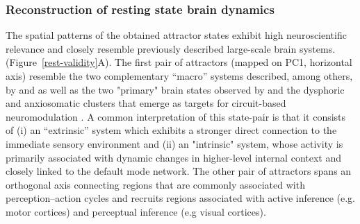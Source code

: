 \documentclass{article}
\begin{document}
\subsubsection{Reconstruction of resting state brain dynamics}\label{Reconstruction of resting state brain dynamics}

The spatial patterns of the obtained attractor states exhibit high neuroscientific relevance and closely resemble previously described large-scale brain systems. (Figure~\ref{rest-validity}A). The first pair of attractors (mapped on PC1, horizontal axis) resemble the two complementary ``macro'' systems described, among others, by \citet{golland2008data} and \citet{cioli2014differences} as well as the two "primary" brain states observed by \citet{chen2018human} and the dysphoric and anxiosomatic clusters that emerge as targets for circuit-based neuromodulation \citep{siddiqi2020distinct}. A common interpretation of this state-pair is that it consists of (i) an ``extrinsic'' system
which exhibits a stronger direct connection to the immediate sensory environment and (ii) an "intrinsic" system, whose
activity is primarily associated with dynamic changes in higher-level internal context and closely linked to the default
mode network.
The other pair of attractors spans an orthogonal axis connecting regions that are commonly associated
with perception--action cycles \citep{fuster2004upper} and recruits regions associated with active inference (e.g. motor cortices) and perceptual inference (e.g visual cortices).
\end{document}
